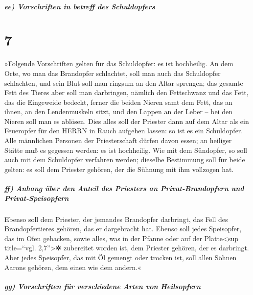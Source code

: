 \hypertarget{ee-vorschriften-in-betreff-des-schuldopfers}{%
\subparagraph{ee) Vorschriften in betreff des
Schuldopfers}\label{ee-vorschriften-in-betreff-des-schuldopfers}}

\hypertarget{section-6}{%
\section{7}\label{section-6}}

»Folgende Vorschriften gelten für das Schuldopfer: es ist
hochheilig. An dem Orte, wo man das Brandopfer schlachtet,
soll man auch das Schuldopfer schlachten, und sein Blut soll man ringsum
an den Altar sprengen; das gesamte Fett des Tieres aber
soll man darbringen, nämlich den Fettschwanz und das Fett, das die
Eingeweide bedeckt, ferner die beiden Nieren samt dem
Fett, das an ihnen, an den Lendenmuskeln sitzt, und den Lappen an der
Leber -- bei den Nieren soll man es ablösen. Dies alles
soll der Priester dann auf dem Altar als ein Feueropfer für den HERRN in
Rauch aufgehen lassen: so ist es ein Schuldopfer. Alle
männlichen Personen der Priesterschaft dürfen davon essen; an heiliger
Stätte muß es gegessen werden: es ist hochheilig. Wie mit
dem Sündopfer, so soll auch mit dem Schuldopfer verfahren werden;
dieselbe Bestimmung soll für beide gelten: es soll dem Priester gehören,
der die Sühnung mit ihm vollzogen hat.

\hypertarget{ff-anhang-uxfcber-den-anteil-des-priesters-an-privat-brandopfern-und-privat-speisopfern}{%
\subparagraph{ff) Anhang über den Anteil des Priesters an
Privat-Brandopfern und
Privat-Speisopfern}\label{ff-anhang-uxfcber-den-anteil-des-priesters-an-privat-brandopfern-und-privat-speisopfern}}

Ebenso soll dem Priester, der jemandes Brandopfer
darbringt, das Fell des Brandopfertieres gehören, das er dargebracht
hat. Ebenso soll jedes Speisopfer, das im Ofen gebacken,
sowie alles, was in der Pfanne oder auf der Platte\textless sup
title=``vgl. 2,7''\textgreater✲ zubereitet worden ist, dem Priester
gehören, der es darbringt. Aber jedes Speisopfer, das mit
Öl gemengt oder trocken ist, soll allen Söhnen Aarons gehören, dem einen
wie dem andern.«

\hypertarget{gg-vorschriften-fuxfcr-verschiedene-arten-von-heilsopfern}{%
\subparagraph{gg) Vorschriften für verschiedene Arten von
Heilsopfern}\label{gg-vorschriften-fuxfcr-verschiedene-arten-von-heilsopfern}}

